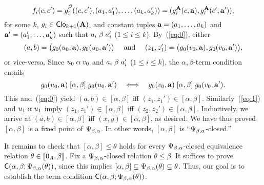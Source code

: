     \[      f_i(c, c') = g_i^{\bbeta}((c, c'), (a_1, a_1'), \dots, (a_k, a_k') )
      = (g_i^{\bA}(c, \ba), g_i^{\bA}(c', \ba')),%
      \]%
    \renewcommand\gA{\ensuremath{g}}%
    for some $k$, $\gA_i \in \sansClo_{k+1}(\bA)$, and constant tuples
    $\mathbf{a} = (a_1, \dots, a_k)$ and $\mathbf{a}' = (a_1', \dots, a_k')$ such that
    $a_i \mathrel{\beta} a_i'$ ($1\leq i\leq k$). 
    By~(\ref{eq:0}), either
    \[
    (a, b) = \bigl(\gA_0(u_0, \ba), \gA_0(u_0, \ba')\bigr)
    \quad \text{ and } \quad 
    (z_1,z_1')= \bigl(\gA_0(v_0, \ba), \gA_0(v_0, \ba')\bigr),
    \]
    or vice-versa.  Since $u_0 \mathrel{\alpha} v_0$ and 
    $a_i \mathrel{\beta} a_i'$ ($1\leq i\leq k$), the $\alpha,\beta$-term condition
    entails
    \[
    \gA_0(u_0, \ba) \commr{\alpha}{\beta} \gA_0(u_0, \ba')
    \quad \Longleftrightarrow \quad 
    \gA_0(v_0, \ba) \commr{\alpha}{\beta} \gA_0(v_0, \ba').
    \]
    This and~(\ref{eq:0}) yield
    $(a,b)\in [\alpha, \beta]$ iff
    $(z_1,z_1')\in [\alpha, \beta]$.
    Similarly~(\ref{eq:1}) and $u_1 \mathrel{\alpha} u_1$ imply
    $(z_1,z_1')\in [\alpha, \beta]$ iff
    $(z_2,z_2')\in [\alpha, \beta]$.  Inductively, we arrive at 
    $(a,b)\in [\alpha, \beta]$ iff $(x,y)\in [\alpha, \beta]$, as desired.
    We have thus proved $[\alpha, \beta]$ is a fixed point of $\Psi_{\beta, \alpha}$.
    In other words, 
    $[\alpha, \beta]$ is ``$\Psi_{\beta, \alpha}$-closed.''

    It remains to check that $[\alpha, \beta] \leq \theta$ holds
    for every $\Psi_{\beta, \alpha}$-closed equivalence relation $\theta \in \llbracket 0_A, \beta\rrbracket$. 
    Fix a $\Psi_{\beta, \alpha}$-closed relation $\theta \leq \beta$. %
    It suffices to prove $\mathsf{C}(\alpha, \beta; \Psi_{\beta, \alpha}(\theta))$, since this implies 
    $[\alpha, \beta] \subseteq \Psi_{\beta, \alpha}(\theta) \subseteq \theta$.
    Thus, our goal is to establish the term condition
    $\mathsf{C}(\alpha, \beta; \Psi_{\beta, \alpha}(\theta))$.


